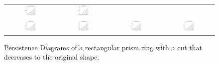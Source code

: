 \documentclass[ma]{uncgdissertationexp}
\theoremstyle{plain}
\theoremstyle{definition}
\theoremstyle{remark}
\begin{document}
\begin{figure}[H]
\begin{center}
\begin{tabular}{cccc}
         \includegraphics[width=0.245\textwidth]{Final Run, (rect prism ring 10 mm cut) persdia.png} & 
         \includegraphics[width=0.245\textwidth]{Final Run, (rect prism ring 05 mm cut) persdia.png} \\ 
         \includegraphics[width=0.245\textwidth]{Final Run, (rect prism ring 03 mm cut) persdia.png} &
         \includegraphics[width=0.245\textwidth]{Final Run, (rect prism ring 02 mm cut) persdia.png} &
         \includegraphics[width=0.245\textwidth]{Final Run, (rect prism ring 01 mm cut) persdia.png} &
         \includegraphics[width=0.245\textwidth]{Final Run, (rect prism ring 00 mm cut) persdia.png} \\
    \end{tabular}
    \end{center}
    \caption{Persistence Diagrams of a rectangular prism ring with a cut that decreases to the original shape.}
    \label{fig:rect_prism_ring_persdia_table}
\end{figure}
\end{document}
